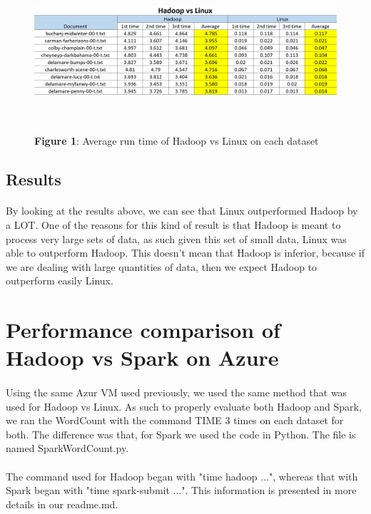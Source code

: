 \documentclass[12pt]{article}
\begin{document}
	\begin{figure}[H]
	\centering
	\includegraphics[width=160mm, height=60mm, scale=1.0]{images/Hadoop_vs_Linux_table.PNG}
	\caption*{\textbf{Figure 1}: Average run time of Hadoop vs Linux on each dataset}
	\end{figure}

	\subsection{Results}
        \paragraph{} By looking at the results above, we can see that Linux outperformed Hadoop 
		by a LOT. One of the reasons for this kind of result is that Hadoop is meant to process 
		very large sets of data, as such given this set of small data, Linux was able to outperform 
		Hadoop. This doesn't mean that Hadoop is inferior, because if we are dealing with large quantities 
		of data, then we expect Hadoop to outperform easily Linux.
        \bigskip

\section{Performance comparison of Hadoop vs Spark on Azure}
	\paragraph{} Using the same Azur VM used previously, we used the same method that was used for Hadoop 
	vs Linux. As such to properly evaluate both Hadoop and Spark, we ran the WordCount with the command 
	TIME 3 times on each dataset for both. The difference was that, for Spark we used the code in Python. 
	The file is named SparkWordCount.py.
	\paragraph{} The command used for Hadoop began with "time hadoop ...", whereas that with Spark began 
	with "time spark-submit ...". This information is presented in more details in our readme.md.
\end{document}
